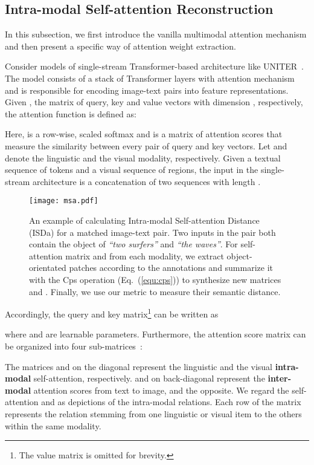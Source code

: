 \documentclass[11pt,a4paper]{article}
\begin{document}
\subsection{Intra-modal Self-attention Reconstruction}
\label{subsec:Intra-modal Self-attention Reconstruction}
In this subsection, we first introduce the vanilla multimodal attention mechanism and then present a specific way of attention weight extraction. 

Consider models of single-stream Transformer-based architecture like UNITER~\cite{UNITER}. 
The model consists of a stack of Transformer layers with attention mechanism~\cite{Attention-is-all-you-need} and is responsible for encoding image-text pairs into feature representations. 
Given , 
the matrix of  query, key and value vectors with dimension , respectively, the attention function  is defined as: 

Here,  is a row-wise, scaled softmax and  is a matrix of attention scores that measure the similarity between every pair of query and key vectors.
Let  and  denote the linguistic and the visual modality, respectively. 
Given a textual sequence  of  tokens and a visual sequence  of  regions, the input  in the single-stream architecture is a concatenation of two sequences with length . 
\begin{figure}[t]
    \centering
    \texttt{[image: msa.pdf]}
    \caption{An example of calculating Intra-modal Self-attention Distance (ISDa) for a matched image-text pair. Two inputs in the pair both contain the object of \textit{``two surfers''} and \textit{``the waves''}. For self-attention matrix  and  from each modality, we extract object-orientated patches according to the annotations and summarize it with the Cps operation (Eq.~(\ref{equ:cps})) to 
  synthesize new matrices  and . Finally, we use our  metric to measure their semantic distance.}
    \label{fig:msa}
\end{figure}
Accordingly, the query and key matrix\footnote{The value matrix  is omitted for brevity.} can be written as

where  and  are learnable parameters. 
Furthermore, the attention score matrix  can be organized into four sub-matrices~\cite{Multimodal-Pretraining-Unmasked}:

The matrices  and  on the diagonal represent the linguistic and the visual \textbf{intra-modal} self-attention, respectively. 
 and  on back-diagonal represent the \textbf{inter-modal} attention scores from text to image, and the opposite.
We regard the self-attention  and  as depictions of the intra-modal relations. Each row of the matrix represents the relation stemming from one linguistic or visual item to the others within the same modality. 
\end{document}
